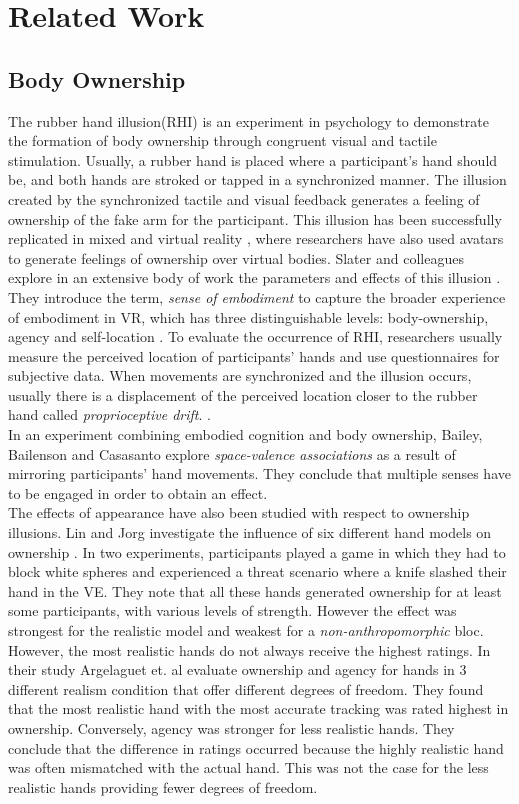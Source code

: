 \section{Related Work}

\subsection{Body Ownership}
The rubber hand illusion\cite{botvinick1998rubber}(RHI) is an experiment in psychology to demonstrate the formation of body ownership through congruent visual and tactile stimulation. Usually, a rubber hand is placed where a participant's hand should be, and both hands are stroked or tapped in a synchronized manner. The illusion created by the synchronized tactile and visual feedback generates a feeling of ownership of the fake arm for the participant. This illusion has been successfully replicated in mixed \cite{ijsselsteijn2006my} and virtual reality \cite{slater2008towards},  where researchers have also used avatars to generate feelings of ownership over virtual bodies. Slater and colleagues explore in an extensive body of work the parameters and effects of this illusion \cite{slater2009inducing}. They introduce the term, \textit{sense of embodiment} to capture the broader experience of embodiment in VR, which has three distinguishable levels: body-ownership, agency and self-location \cite{kilteni2012sense}. To evaluate the occurrence of RHI, researchers usually measure the perceived location of participants' hands and use questionnaires for subjective data. When movements are synchronized and the illusion occurs, usually there is a displacement of the perceived location closer to the rubber hand called \textit{proprioceptive drift}. \cite{rohde2011rubber}. \\
In an experiment combining embodied cognition and body ownership, Bailey, Bailenson and Casasanto \cite{bailey2016does} explore \textit{space-valence associations} as a result of mirroring participants' hand movements. They conclude that multiple senses have to be engaged in order to obtain an effect. \\
The effects of appearance have also been studied with respect to ownership illusions. Lin and Jorg investigate the influence of six different hand models on ownership \cite{lin2016need}. In two experiments, participants played a game in which they had to block white spheres and experienced a threat scenario where a knife slashed their hand in the VE. They note that all these hands generated ownership for at least some participants, with various levels of strength. However the effect was strongest for the realistic model and weakest for a \textit{non-anthropomorphic} bloc. However, the most realistic hands do not always receive the highest ratings. In their study Argelaguet et. al \cite{ argelaguet2016role} evaluate ownership and agency for hands in 3 different realism condition that offer different degrees of freedom. They found that the most realistic hand with the most accurate tracking was rated highest in ownership. Conversely, agency was stronger for less realistic hands. They conclude that the difference in ratings occurred because the highly realistic hand was often mismatched with the actual hand. This was not the case for the less realistic hands providing fewer degrees of freedom.
